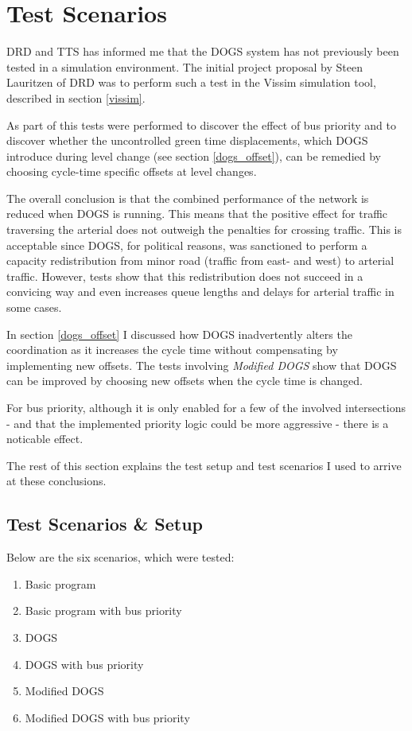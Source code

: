 \section{Test Scenarios}
DRD and TTS has informed me that the DOGS system has not previously been tested in a simulation environment. The initial project proposal by Steen Lauritzen of DRD was to perform such a test in the Vissim simulation tool, described in section \ref{vissim}.

As part of this tests were performed to discover the effect of bus priority and to discover whether the uncontrolled green time displacements, which DOGS introduce during level change (see section \ref{dogs_offset}), can be remedied by choosing cycle-time specific offsets at level changes.

The overall conclusion is that the combined performance of the network is reduced when DOGS is running. This means that the positive effect for traffic traversing the arterial does not outweigh the penalties for crossing traffic. 
This is acceptable since DOGS, for political reasons, was sanctioned to perform a capacity redistribution from minor road (traffic from east- and west) to arterial traffic. However, tests show that this redistribution does not succeed in a convicing way and even increases queue lengths and delays for arterial traffic in some cases.

In section \ref{dogs_offset} I discussed how DOGS inadvertently alters the coordination as it increases the cycle time without compensating by implementing new offsets. The tests involving \textit{Modified DOGS} show that DOGS can be improved by choosing new offsets when the cycle time is changed.

For bus priority, although it is only enabled for a few of the involved intersections - and that the implemented priority logic could be more aggressive - there is a noticable effect.

The rest of this section explains the test setup and test scenarios I used to arrive at these conclusions. 

\subsection{Test Scenarios \& Setup}

Below are the six scenarios, which were tested:

\begin{enumerate}
\item Basic program
\item Basic program with bus priority
\item DOGS
\item DOGS with bus priority
\item Modified DOGS
\item Modified DOGS with bus priority
\end{enumerate}

